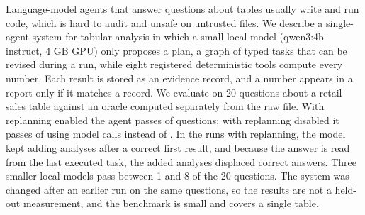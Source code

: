 Language-model agents that answer questions about tables usually write and run code, which is hard to audit and unsafe on untrusted files. We describe a single-agent system for tabular analysis in which a small local model (qwen3:4b-instruct, 4 GB GPU) only proposes a plan, a graph of typed tasks that can be revised during a run, while eight registered deterministic tools compute every number. Each result is stored as an evidence record, and a number appears in a report only if it matches a record. We evaluate on 20 questions about a retail sales table against an oracle computed separately from the raw file. With replanning enabled the agent passes \MainQ{} of \MainN{} questions; with replanning disabled it passes \NoRepQ{} of \NoRepN{} using \NoRepCalls{} model calls instead of \MainCalls{}. In the runs with replanning, the model kept adding analyses after a correct first result, and because the answer is read from the last executed task, the added analyses displaced correct answers. Three smaller local models pass between 1 and 8 of the 20 questions. The system was changed after an earlier run on the same questions, so the results are not a held-out measurement, and the benchmark is small and covers a single table.
